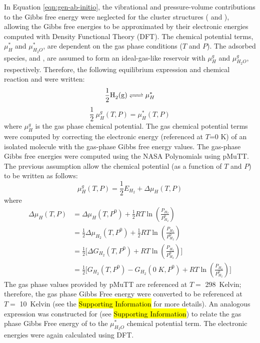 \documentclass[journal=jctcce,manuscript=article]{achemso}
\begin{document}
In Equation \ref{eqn:gen-ab-initio}, the vibrational and pressure-volume contributions to the Gibbs free energy were neglected for the cluster structures ( and ), allowing the Gibbs free energies to be approximated by their electronic energies computed with Density Functional Theory (DFT). The chemical potential terms, $\mu_{H}^{*}$ and $\mu_{H_{2}O}^{*}$, are dependent on the gas phase conditions ($T$ and $P$). The adsorbed species,  and , are assumed to form an ideal-gas-like reservoir with $\mu_{H}^{g}$ and $\mu_{H_{2}O}^{g}$, respectively. Therefore, the following equilibrium expression and chemical reaction and were written:   
\begin{equation} \label{exp:chemicalpotential}
    \ce{1/2 H2(g) <=> $\mu_{H}^{*}$}
\end{equation}
\begin{equation} \label{eqn:chemicalpotential}
    \frac{1}{2} \: \mu_{H}^{g}(T,P) = \mu_{H}^{*}(T,P)
\end{equation}
where $\mu_{H}^{g}$ is the gas phase chemical potential. The gas chemical potential terms were computed by correcting the electronic energy (referenced at $T$=0 K) of an isolated molecule with the gas-phase Gibbs free energy values. The gas-phase Gibbs free energies were computed using the NASA Polynomials\cite{Mcbride1993} using pMuTT.\cite{LYM2019106864} The previous assumption allow the chemical potential (as a function of $T$ and $P$) to be written as follows:  
\begin{equation}
     \mu_{H}^{g}(T,P) = \frac{1}{2} E_{H_2} + \Delta \mu_{H}(T,P)
\end{equation}
where
\begin{equation}
    \begin{split}
    \Delta \mu_{H}(T,P) 
    & = \Delta \mu_{H}(T,P^{0}) + \frac{1}{2} RT \ln{(\frac{P_{H_{2}}}{P_{H_{2}}^{0}})} \\
    & = \frac{1}{2} \Delta \mu_{H_{2}}(T,P^{0}) + \frac{1}{2} RT \ln{(\frac{P_{H_{2}}}{P_{H_{2}}^{0}})} \\
    & = \frac{1}{2} \bigg[ \Delta G_{H_{2}}(T,P^{0}) + RT \ln{(\frac{P_{H_{2}}}{P_{H_{2}}^{0}})} \bigg] \\  
    & = \frac{1}{2} \bigg[G_{H_{2}}(T,P^{0}) - G_{H_{2}}(0\;K,P^{0}) + RT \ln{(\frac{P_{H_{2}}}{P_{H_{2}}^{0}})} \bigg]
    \end{split}
\end{equation}
The gas phase values provided by pMuTT are referenced at $T=$ \SI{298}{Kelvin}; therefore, the gas phase Gibbs Free energy were converted to be referenced at $T=$ \SI{10}{Kelvin} (see the \hl{Supporting Information} for more details). An analogous expression was constructed for  (see \hl{Supporting Information}) to relate the gas phase Gibbs Free energy of  to the $\mu_{H_{2}O}^{*}$ chemical potential term. The electronic energies were again calculated using DFT.  
\end{document}
